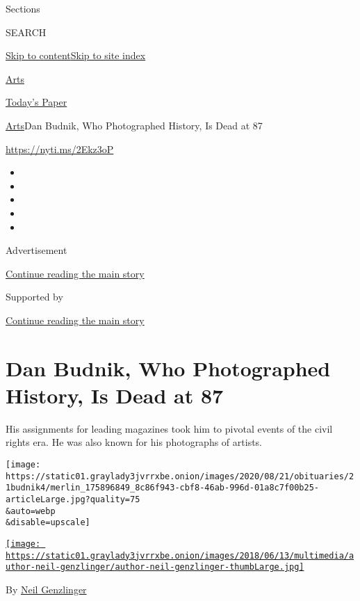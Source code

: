 Sections

SEARCH

\protect\hyperlink{site-content}{Skip to
content}\protect\hyperlink{site-index}{Skip to site index}

\href{https://www.nytimes3xbfgragh.onion/section/arts}{Arts}

\href{https://myaccount.nytimes3xbfgragh.onion/auth/login?response_type=cookie\&client_id=vi}{}

\href{https://www.nytimes3xbfgragh.onion/section/todayspaper}{Today's
Paper}

\href{/section/arts}{Arts}\textbar{}Dan Budnik, Who Photographed
History, Is Dead at 87

\url{https://nyti.ms/2Ekz3oP}

\begin{itemize}
\item
\item
\item
\item
\item
\end{itemize}

Advertisement

\protect\hyperlink{after-top}{Continue reading the main story}

Supported by

\protect\hyperlink{after-sponsor}{Continue reading the main story}

\hypertarget{dan-budnik-who-photographed-history-is-dead-at-87}{%
\section{Dan Budnik, Who Photographed History, Is Dead at
87}\label{dan-budnik-who-photographed-history-is-dead-at-87}}

His assignments for leading magazines took him to pivotal events of the
civil rights era. He was also known for his photographs of artists.

\texttt{[image: https://static01.graylady3jvrrxbe.onion/images/2020/08/21/obituaries/21budnik4/merlin\_175896849\_8c86f943-cbf8-46ab-996d-01a8c7f00b25-articleLarge.jpg?quality=75\\\&auto=webp\\\&disable=upscale]}

\href{https://www.nytimes3xbfgragh.onion/by/neil-genzlinger}{\texttt{[image: https://static01.graylady3jvrrxbe.onion/images/2018/06/13/multimedia/author-neil-genzlinger/author-neil-genzlinger-thumbLarge.jpg]}}

By \href{https://www.nytimes3xbfgragh.onion/by/neil-genzlinger}{Neil
Genzlinger}

